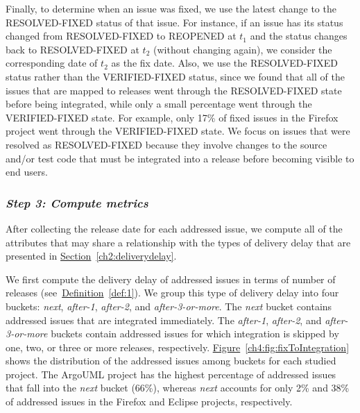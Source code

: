 Finally, to determine when an issue was fixed, we use the latest change to the
RESOLVED-FIXED status of that issue.  For instance, if an issue has its status
changed from RESOLVED-FIXED to REOPENED at $t_1$ and the status changes back to
RESOLVED-FIXED at $t_2$ (without changing again), we consider the corresponding
date of $t_2$ as the fix date. Also, we use the RESOLVED-FIXED status rather
than the VERIFIED-FIXED status, since we found that all of the issues that are
mapped to releases went through the RESOLVED-FIXED state before being integrated, while
only a small percentage went through the VERIFIED-FIXED state. For example, only 17\% of
fixed issues in the Firefox project went through the VERIFIED-FIXED state.
We focus on issues that were resolved as RESOLVED-FIXED because they involve
changes to the source and/or test code that must be integrated into a release
before becoming visible to end users.

\subsubsection*{\textbf{\textit{Step 3: Compute metrics}}} \label{settings:step3}

After collecting the release date for each addressed issue, we compute all of the
attributes that may share a relationship with the types of delivery delay that
are presented in
\hyperref[ch2:deliverydelay]{Section}~\ref{ch2:deliverydelay}.

We first compute the delivery delay of addressed issues in terms of number of
releases (see~\hyperref[def:1]{Definition}~\ref{def:1}). We group this type of
delivery delay into four buckets: \textit{next}, \textit{after-1},
\textit{after-2}, and \textit{after-3-or-more}. The \textit{next} bucket
contains addressed issues that are integrated immediately. The \textit{after-1},
\textit{after-2}, and \textit{after-3-or-more} buckets contain addressed issues
for which integration is skipped by one, two, or three or more releases,
respectively.
\hyperref[ch4:fig:fixToIntegration]{Figure}~\ref{ch4:fig:fixToIntegration} shows
the distribution of the addressed issues among buckets for each studied project.
The ArgoUML project has the highest percentage of addressed issues that fall
into the \textit{next} bucket (66\%), whereas \textit{next} accounts for only
2\% and 38\% of addressed issues in the Firefox and Eclipse projects,
respectively. 

